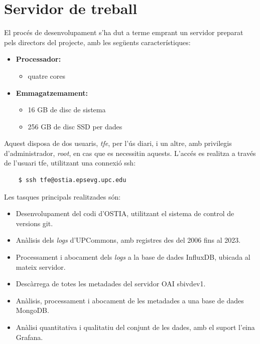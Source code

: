 \chapter{Servidor de treball}\label{ch:server-description}

El procés de desenvolupament s’ha dut a terme emprant un servidor preparat pels directors del projecte, amb les següents característiques:

\begin{itemize}
    \item \textbf{Processador:}
    \begin{itemize}
        \item quatre cores
    \end{itemize}
    \item \textbf{Emmagatzemament:}
    \begin{itemize}
        \item 16 GB de disc de sistema
        \item 256 GB de disc SSD per dades
    \end{itemize}
\end{itemize}

\noindent
Aquest disposa de dos usuaris, \textit{tfe}, per l’ús diari, i un altre, amb privilegis d’administrador, \textit{root}, en cas que es necessitin aquests.
L’accés es realitza a través de l’usuari tfe, utilitzant una connexió \gls{ssh}:

\begin{verbatim}
    $ ssh tfe@ostia.epsevg.upc.edu
\end{verbatim}

\noindent
Les tasques principals realitzades són:

\begin{itemize}
    \item Desenvolupament del codi d’\gls{OSTIA}, utilitzant el sistema de control de versions git.
    \item Anàlisis dels \textit{\gls{log}s} d’\gls{UPCommons}, amb registres des del 2006 fins al 2023.
    \item Processament i abocament dels \textit{\gls{log}s} a la base de dades InfluxDB, ubicada al mateix servidor.
    \item Descàrrega de totes les metadades del servidor \gls{OAI} sbivdev1.
    \item Anàlisis, processament i abocament de les metadades a una base de dades MongoDB.
    \item Anàlisi quantitativa i qualitatiu del conjunt de les dades, amb el suport l’eina Grafana.
\end{itemize}

